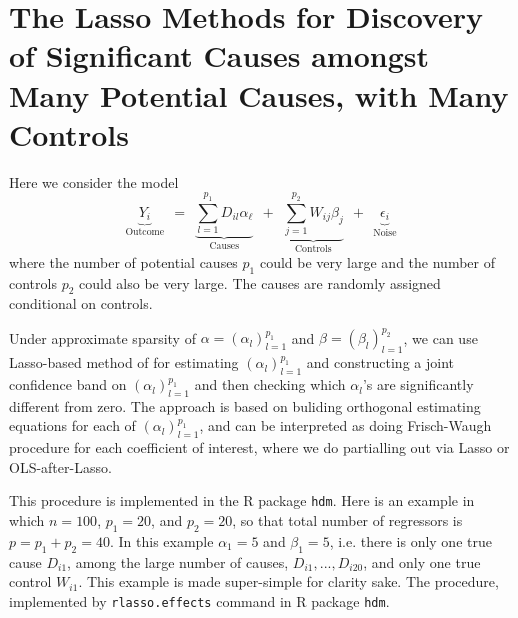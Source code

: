 \documentclass{amsart}\usepackage[]{graphicx}\usepackage[]{color}
\begin{document}
\section{The Lasso Methods for Discovery of Significant
Causes amongst Many Potential Causes, with Many Controls}
Here we consider the model
$$
\underbrace{Y_{i}}_{\mathrm{Outcome}} \ \ =  \ \ \underbrace{\sum_{l=1}^{p_1} D_{il} \alpha_\ell}_{
\mathrm{Causes}} \ \ + \ \ \underbrace{\sum_{j=1}^{p_2} 
W_{ij} \beta_j}_{\mathrm{Controls}} \ \ + \ \ \underbrace{\epsilon_i}_{\mathrm{Noise}}
$$
where the number of potential causes $p_1$ could be very large and the number of controls $p_2$ could also be very large. The causes are randomly assigned conditional on controls.

Under approximate sparsity of $ \alpha = (\alpha_l)_{l=1}^{p_1}$
and $\beta = (\beta_l)_{l=1}^{p_2}$, we can use Lasso-based method of \cite{BCK2014} for
estimating $(\alpha_l)_{l=1}^{p_1}$ and constructing a joint confidence band on  $(\alpha_l)_{l=1}^{p_1}$ and then checking which $\alpha_l$'s are significantly different from zero. The approach is based on buliding orthogonal estimating equations for each of $(\alpha_l)_{l=1}^{p_1}$, and can be interpreted as doing Frisch-Waugh procedure for each coefficient of interest, where we do partialling out via Lasso or OLS-after-Lasso.


This procedure is implemented in the R package \texttt{hdm}. Here is
an example in which $n=100$, $p_1=20$, and $p_2=20$, so that total number of regressors is $p = p_1 + p_2 = 40$.  In this example $\alpha_1 =5$ and $\beta_1 = 5$, i.e. there is only
one true cause $D_{i1}$, among the large number of causes, $D_{i1},..., D_{i20}$, and only one true control $W_{i1}$.   This example is made super-simple for clarity sake. The \cite{BCK2014} procedure, implemented by \texttt{rlasso.effects} command in R package \texttt{hdm}. 
\end{document}
